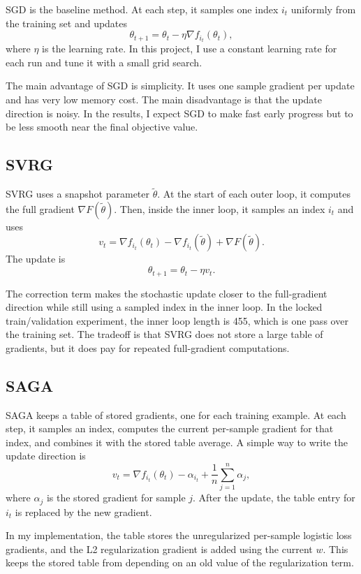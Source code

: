 \documentclass{article}
\begin{document}
SGD is the baseline method. At each step, it samples one index $i_t$ uniformly
from the training set and updates
\[
\theta_{t+1} = \theta_t - \eta \nabla f_{i_t}(\theta_t),
\]
where $\eta$ is the learning rate. In this project, I use a constant learning
rate for each run and tune it with a small grid search.

The main advantage of SGD is simplicity. It uses one sample gradient per update
and has very low memory cost. The main disadvantage is that the update direction
is noisy. In the results, I expect SGD to make fast early progress but to be
less smooth near the final objective value.

\subsection{SVRG}

SVRG uses a snapshot parameter $\tilde{\theta}$. At the start of each outer
loop, it computes the full gradient $\nabla F(\tilde{\theta})$. Then, inside
the inner loop, it samples an index $i_t$ and uses
\[
v_t =
\nabla f_{i_t}(\theta_t)
- \nabla f_{i_t}(\tilde{\theta})
+ \nabla F(\tilde{\theta}).
\]
The update is
\[
\theta_{t+1} = \theta_t - \eta v_t.
\]

The correction term makes the stochastic update closer to the full-gradient
direction while still using a sampled index in the inner loop. In the locked
train/validation experiment, the inner loop length is 455, which is one pass
over the training set. The tradeoff is that SVRG does not store a large table
of gradients, but it does pay for repeated full-gradient computations.

\subsection{SAGA}

SAGA keeps a table of stored gradients, one for each training example. At each
step, it samples an index, computes the current per-sample gradient for that
index, and combines it with the stored table average. A simple way to write the
update direction is
\[
v_t =
\nabla f_{i_t}(\theta_t)
- \alpha_{i_t}
+ \frac{1}{n}\sum_{j=1}^{n}\alpha_j,
\]
where $\alpha_j$ is the stored gradient for sample $j$. After the update, the
table entry for $i_t$ is replaced by the new gradient.

In my implementation, the table stores the unregularized per-sample logistic
loss gradients, and the L2 regularization gradient is added using the current
$w$. This keeps the stored table from depending on an old value of the
regularization term.
\end{document}
